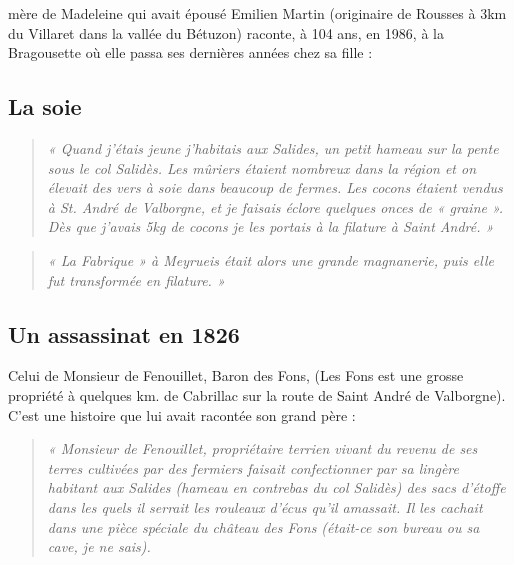 



\medskip

 mère de Madeleine qui avait épousé Emilien Martin (originaire de
Rousses à 3km du Villaret dans la vallée du Bétuzon) raconte, à 104 ans, en 1986, à la
Bragousette où elle passa ses dernières années chez sa fille :

\medskip

\subsection{La soie}

\begin{quote}
\textit{« Quand j’étais jeune j’habitais aux Salides, un petit hameau sur la pente sous le col Salidès.
Les mûriers étaient nombreux dans la région et on élevait des vers à soie dans beaucoup de
fermes. Les cocons étaient vendus à St. André de Valborgne, et je faisais éclore quelques
onces de « graine ». Dès que j’avais 5kg de cocons je les portais à la filature à Saint André. »}
\end{quote}

\begin{quote}
\textit{« La Fabrique » à Meyrueis était alors une grande magnanerie, puis elle fut transformée en
filature. »}
\end{quote}

\medskip

\subsection{Un assassinat en 1826}

Celui de Monsieur de Fenouillet, Baron des Fons, (Les Fons est une grosse propriété à
quelques km. de Cabrillac sur la route de Saint André de Valborgne). C’est une histoire que
lui avait racontée son grand père :

\begin{quote}
\textit{« Monsieur de Fenouillet, propriétaire terrien vivant du revenu de ses terres cultivées par
des fermiers faisait confectionner par sa lingère habitant aux Salides (hameau en contrebas
du col Salidès) des sacs d’étoffe dans les quels il serrait les rouleaux d’écus qu’il amassait. Il
les cachait dans une pièce spéciale du château des Fons (était-ce son bureau ou sa cave, je ne
sais).}
\end{quote}

